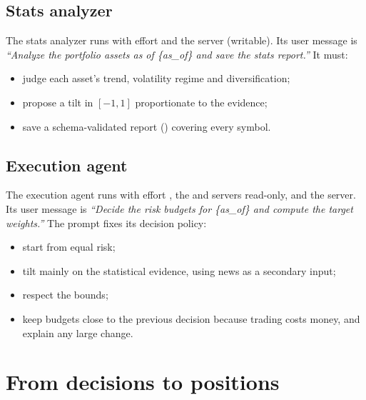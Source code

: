 \documentclass[11pt,a4paper]{article}
\makeatletter
\newcommand{\snippetsource}[1]{\csname snippet@#1\endcsname}
\newcommand{\snippet}[3]{%
  }
\newcommand{\prompt}[2]{%
  }
\makeatother
\begin{document}
\subsection{Stats analyzer}
The stats analyzer runs with effort  and the  server (writable). Its
user message is \emph{``Analyze the portfolio assets as of \{as\_of\} and save the stats
report.''} It must:
\begin{itemize}
  \item judge each asset's trend, volatility regime and diversification;
  \item propose a tilt in $[-1,1]$ proportionate to the evidence;
  \item save a schema-validated report () covering every symbol.
\end{itemize}
\prompt{stats_system}{Stats analyzer system prompt (template)}

\subsection{Execution agent}
The execution agent runs with effort , the  and  servers
read-only, and the  server. Its user message is \emph{``Decide the risk
budgets for \{as\_of\} and compute the target weights.''} The prompt fixes its decision
policy:
\begin{itemize}
  \item start from equal risk;
  \item tilt mainly on the statistical evidence, using news as a secondary input;
  \item respect the bounds;
  \item keep budgets close to the previous decision because trading costs money, and
        explain any large change.
\end{itemize}
\prompt{execution_system}{Execution agent system prompt (template)}
\prompt{backtest_note}{Backtest note, appended for non-live runs (\code{\{mode\_note\}})}
\snippet{team_calls}{Python}{How each agent is called: prompts, user messages, servers, effort}

\section{From decisions to positions}\label{sec:decisions}
\end{document}
